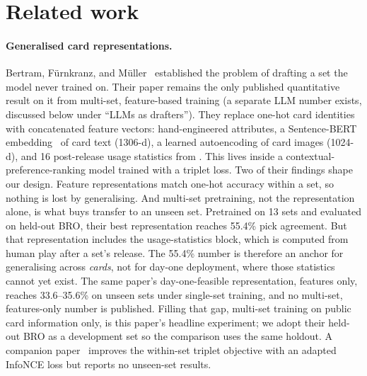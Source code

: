 \section{Related work}
\label{sec:related}

\paragraph{Generalised card representations.}
Bertram, F\"urnkranz, and M\"uller~\citep{bertram2024cards} established the
problem of drafting a set the model never trained on. Their paper remains
the only published quantitative result on it from multi-set,
feature-based training (a separate LLM number exists, discussed below under
``LLMs as drafters''). They replace one-hot card identities with
concatenated feature vectors: hand-engineered attributes, a Sentence-BERT
embedding~\citep{reimers2019sbert} of card text (1306-d), a learned
autoencoding of card images (1024-d), and 16 post-release usage statistics
from \seventeenlands{}. This lives inside a contextual-preference-ranking
model trained with a triplet loss. Two of their findings shape our design.
Feature representations match one-hot accuracy within a set, so nothing is
lost by generalising. And multi-set pretraining, not the representation
alone, is what buys transfer to an unseen set. Pretrained on 13 sets and
evaluated on held-out BRO, their best representation reaches 55.4\% pick
agreement. But that representation includes the usage-statistics block,
which is computed from human play after a set's release. The 55.4\% number
is therefore an anchor for generalising across \emph{cards}, not for
day-one deployment, where those statistics cannot yet exist. The same
paper's day-one-feasible representation, features only, reaches
33.6--35.6\% on unseen sets under single-set training, and no multi-set,
features-only number is published. Filling that gap, multi-set training on
public card information only, is this paper's headline experiment; we
adopt their held-out BRO as a development set so the comparison uses the
same holdout. A companion paper~\citep{bertram2024infonce} improves the
within-set triplet objective with an adapted InfoNCE loss but reports no
unseen-set results.

